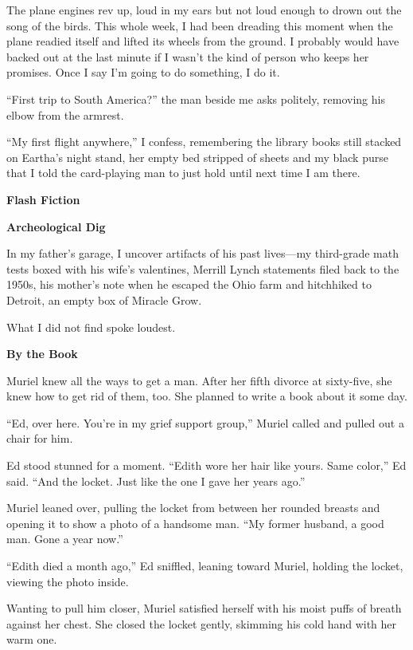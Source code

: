 \documentclass[
]{article}
\begin{document}
The plane engines rev up, loud in my ears but not loud enough to drown
out the song of the birds. This whole week, I had been dreading this
moment when the plane readied itself and lifted its wheels from the
ground. I probably would have backed out at the last minute if I wasn't
the kind of person who keeps her promises. Once I say I'm going to do
something, I do it.

``First trip to South America?'' the man beside me asks politely,
removing his elbow from the armrest.

``My first flight anywhere,'' I confess, remembering the library books
still stacked on Eartha's night stand, her empty bed stripped of sheets
and my black purse that I told the card-playing man to just hold until
next time I am there.

\textbf{Flash Fiction}

\textbf{\hfill\break
}

\textbf{Archeological Dig}

In my father's garage, I uncover artifacts of his past lives---my
third-grade math tests boxed with his wife's valentines, Merrill Lynch
statements filed back to the 1950s, his mother's note when he escaped
the Ohio farm and hitchhiked to Detroit, an empty box of Miracle Grow.

What I did not find spoke loudest.

\textbf{\hfill\break
}

\textbf{By the Book}

Muriel knew all the ways to get a man. After her fifth divorce at
sixty-five, she knew how to get rid of them, too. She planned to write a
book about it some day.

``Ed, over here. You're in my grief support group,'' Muriel called and
pulled out a chair for him.

Ed stood stunned for a moment. ``Edith wore her hair like yours. Same
color,'' Ed said. ``And the locket. Just like the one I gave her years
ago.''

Muriel leaned over, pulling the locket from between her rounded breasts
and opening it to show a photo of a handsome man. ``My former husband, a
good man. Gone a year now.''

``Edith died a month ago,'' Ed sniffled, leaning toward Muriel, holding
the locket, viewing the photo inside.

Wanting to pull him closer, Muriel satisfied herself with his moist
puffs of breath against her chest. She closed the locket gently,
skimming his cold hand with her warm one.
\end{document}
